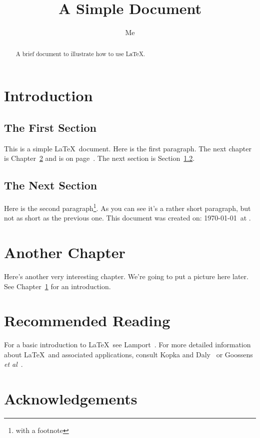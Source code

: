\documentclass[12pt]{scrreprt}
\title{A Simple Document}
\author{Me}
\begin{document}
\maketitle

\tableofcontents

\begin{abstract}
A brief document to
illustrate how to use \LaTeX.
\end{abstract}

\chapter{Introduction}
\label{ch:intro}

\section{The First Section}

This is a simple \LaTeX\ document.
Here is the first paragraph.
The next chapter is Chapter~\ref{ch:another}
and is on page~\pageref{ch:another}.
The next section is Section~\ref{sec:next}.

\section{The Next Section}
\label{sec:next}

Here is the second paragraph\footnote{with a footnote}. 
As you can see it's a rather short paragraph, but not 
as short as the previous one. This document was 
created on: \today\ at \currenttime.

\chapter{Another Chapter}
\label{ch:another}

Here's another very interesting chapter.
We're going to put a picture here later.
See Chapter~\ref{ch:intro} for an 
introduction.

\chapter{Recommended Reading}

For a basic introduction to \LaTeX\ see Lamport~\cite{lamport94}.
For more detailed information about \LaTeX\ and
associated applications, consult Kopka and Daly~\cite{kopka95}
or Goossens \emph{et al}~\cite{goossens94}.

\chapter*{Acknowledgements}
\end{document}
